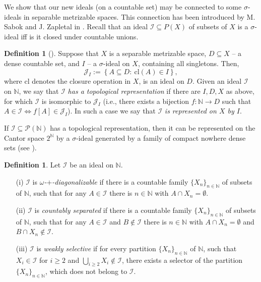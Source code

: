 \documentclass{amsart}
\theoremstyle{definition}
\newtheorem{df}[thm]{Definition}
\newcommand{\N}{{\mathbb N}}
\newcommand{\I}{\mathcal I}
\newcommand{\cl}{\mathrm{cl}}
\begin{document}
We show that our new ideals (on a countable set) may be connected to some $\sigma$-ideals in separable metrizable spaces. This connection has been introduced by M. Sabok and J. Zapletal in \cite{Sabok}. Recall that an ideal $\mathcal{I}\subseteq P(X)$ of subsets of
$X$ is a $\sigma$-ideal iff is it closed under countable unions.

\begin{df}[\cite{Sabok}]
Suppose that $X$ is a separable metrizable space, $D\subseteq X$ -- a dense countable set, and $I$ -- a $\sigma$-ideal on $X$, containing all singletons. Then,
$$\mathcal{J}_I:=\left\{A\subseteq D :\ \cl(A)\in I\right\},$$
where $\cl$ denotes the closure operation in $X$,
is an ideal on $D$. Given an ideal $\mathcal{I}$ on $\N$, we say that $\mathcal{I}$ \emph{has a topological representation} if there are $I,D,X$ as above, for which $\mathcal{I}$ is isomorphic to $\mathcal{J}_I$ (i.e., there exists a bijection $f\colon \N\to D$ such that $A\in\I \Leftrightarrow f[A]\in\mathcal{J}_I$). In such a case we say that $\mathcal{I}$ \emph{is represented on $X$ by $I$}.
\end{df}

If $\mathcal{I}\subseteq\mathcal{P}(\N)$ has a topological representation, then it can be represented on the Cantor space $2^\N$ by a $\sigma$-ideal generated by a family of compact nowhere dense sets (see \cite[Corollary 1.3]{Adas}). 

\begin{df} Let $\mathcal{I}$ be an ideal on $\N$.
\begin{enumerate}
\item[(i)] $\mathcal{I}$ is \emph{$\omega$-$+$-diagonalizable} if there is a countable family $\{X_n\}_{n\in\N}$ of subsets of $\N$, such that for any $A\in \mathcal{I}$ there is $n\in\N$ with $A\cap X_n=\emptyset$.
\item[(ii)] $\mathcal{I}$ is \emph{countably separated} if there is a countable family $\{X_n\}_{n\in\N}$ of subsets of $\N$, such that for any $A\in \mathcal{I}$ and $B\notin \mathcal{I}$ there is $n\in\N$ with $A\cap X_n=\emptyset$ and $B\cap X_n\notin \mathcal{I}$. %
\item[(iii)] $\mathcal{I}$ is \emph{weakly selective} if for every partition $\{X_n\}_{n\in\N}$ of $\N$, such that $X_i\in\I$ for $i\geq 2$ and $\bigcup_{i\geq 2}{X_i} \notin\I$, there exists a selector of the partition $\{X_n\}_{n\in\N}$, which does not belong to $\I$.
\end{enumerate}
\end{df}
\end{document}
